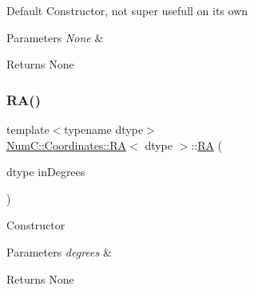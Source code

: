 Default Constructor, not super usefull on its own


\begin{DoxyParams}{Parameters}
{\em None} & \\
\hline
\end{DoxyParams}
\begin{DoxyReturn}{Returns}
None 
\end{DoxyReturn}
\mbox{\label{class_num_c_1_1_coordinates_1_1_r_a_a694c2d0953ae789b22ca8ea031381b51}} 
\subsubsection{\texorpdfstring{R\+A()}{RA()}\hspace{0.1cm}{\footnotesize\ttfamily [2/3]}}
{\footnotesize\ttfamily template$<$typename dtype$>$ \\
\mbox{\hyperlink{class_num_c_1_1_coordinates_1_1_r_a}{Num\+C\+::\+Coordinates\+::\+RA}}$<$ dtype $>$\+::\mbox{\hyperlink{class_num_c_1_1_coordinates_1_1_r_a}{RA}} (\begin{DoxyParamCaption}\item[{dtype}]{in\+Degrees }\end{DoxyParamCaption})\hspace{0.3cm}{\ttfamily [inline]}}

Constructor


\begin{DoxyParams}{Parameters}
{\em degrees} & \\
\hline
\end{DoxyParams}
\begin{DoxyReturn}{Returns}
None 
\end{DoxyReturn}
\mbox{\label{class_num_c_1_1_coordinates_1_1_r_a_a66f414e4b65e1fa0bc1fc76b3b9c6794}} 
